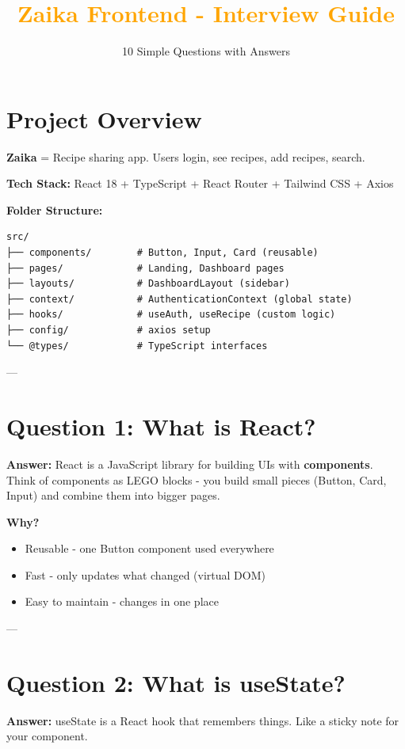 \documentclass[11pt]{article}
\title{\textcolor{orange}{\textbf{Zaika Frontend - Interview Guide}}}
\author{10 Simple Questions with Answers}
\date{}
\begin{document}
\maketitle

\section*{Project Overview}

\textbf{Zaika} = Recipe sharing app. Users login, see recipes, add recipes, search.

\textbf{Tech Stack:} React 18 + TypeScript + React Router + Tailwind CSS + Axios

\textbf{Folder Structure:}
\begin{lstlisting}
src/
├── components/        # Button, Input, Card (reusable)
├── pages/             # Landing, Dashboard pages
├── layouts/           # DashboardLayout (sidebar)
├── context/           # AuthenticationContext (global state)
├── hooks/             # useAuth, useRecipe (custom logic)
├── config/            # axios setup
└── @types/            # TypeScript interfaces
\end{lstlisting}

---

\section*{Question 1: What is React?}

\textbf{Answer:} React is a JavaScript library for building UIs with \textbf{components}. Think of components as LEGO blocks - you build small pieces (Button, Card, Input) and combine them into bigger pages.

\textbf{Why?} 
\begin{itemize}
    \item Reusable - one Button component used everywhere
    \item Fast - only updates what changed (virtual DOM)
    \item Easy to maintain - changes in one place
\end{itemize}

---

\section*{Question 2: What is useState?}

\textbf{Answer:} useState is a React hook that remembers things. Like a sticky note for your component.
\end{document}
